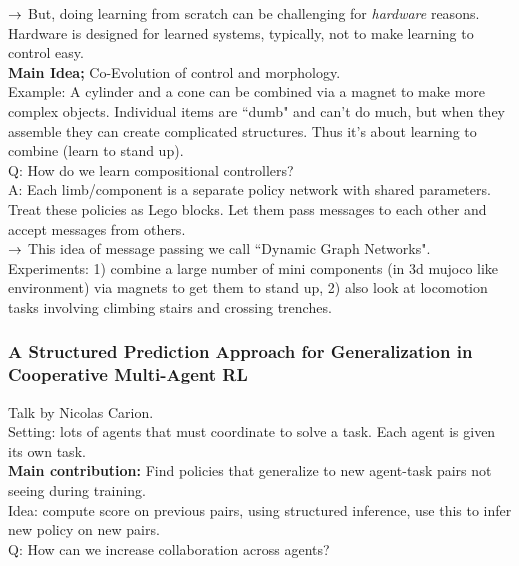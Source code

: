 $\rightarrow$ But, doing learning from scratch can be challenging for {\it hardware} reasons. Hardware is designed for learned systems, typically, not to make learning to control easy. \\

{\bf Main Idea;} Co-Evolution of control and morphology. \\

Example: A cylinder and a cone can be combined via a magnet to make more complex objects. Individual items are ``dumb" and can't do much, but when they assemble they can create complicated structures. Thus it's about learning to combine (learn to stand up). \\

Q: How do we learn compositional controllers? \\

A: Each limb/component is a separate policy network with shared parameters. Treat these policies as Lego blocks. Let them pass messages to each other and accept messages from others. \\

$\rightarrow$ This idea of message passing we call ``Dynamic Graph Networks". \\

Experiments: 1) combine a large number of mini components (in 3d mujoco like environment) via magnets to get them to stand up, 2) also look at locomotion tasks involving climbing stairs and crossing trenches.


\subsubsection{A Structured Prediction Approach for Generalization in Cooperative Multi-Agent RL \cite{carion2019structured}}

Talk by Nicolas Carion. \\

Setting: lots of agents that must coordinate to solve a task. Each agent is given its own task. \\

{\bf Main contribution:} Find policies that generalize to new agent-task pairs not seeing during training. \\

Idea: compute score on previous pairs, using structured inference, use this to infer new policy on new pairs. \\

Q: How can we increase collaboration across agents? \\

